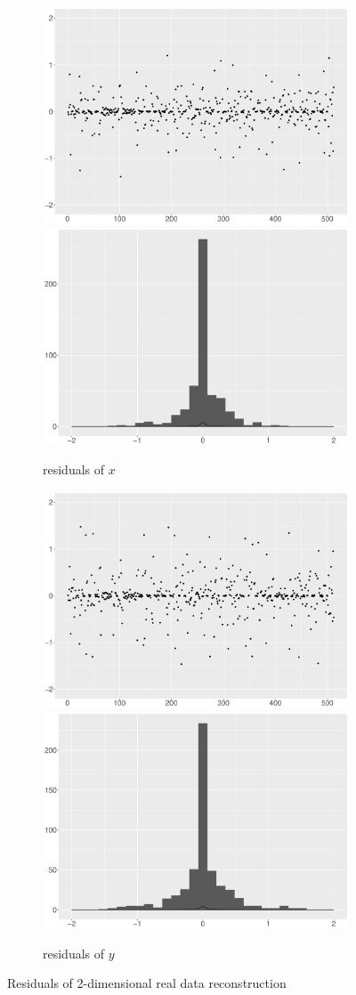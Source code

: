 \begin{figure}[!ht]
    \centering
    \begin{subfigure}{\textwidth}
    \centering
    \includegraphics[width=0.45\linewidth]{Chapters/02TractorSplineTheory/plot/ggplot/ggRealdataXYResidualsXpoints.pdf}
    \includegraphics[width=0.45\linewidth]{Chapters/02TractorSplineTheory/plot/ggplot/ggRealdataXYResidualsXhist.pdf}
    \caption{residuals of $x$ }
    \end{subfigure}
    \begin{subfigure}{\textwidth}
    \centering
    \includegraphics[width=0.45\linewidth]{Chapters/02TractorSplineTheory/plot/ggplot/ggRealdataXYResidualsYpoints.pdf}
    \includegraphics[width=0.45\linewidth]{Chapters/02TractorSplineTheory/plot/ggplot/ggRealdataXYResidualsYhist.pdf}
    \caption{residuals of $y$ }
    \end{subfigure}
\caption{Residuals of 2-dimensional real data reconstruction }\label{tractorsplineResidualsRealdata}
 \end{figure}

